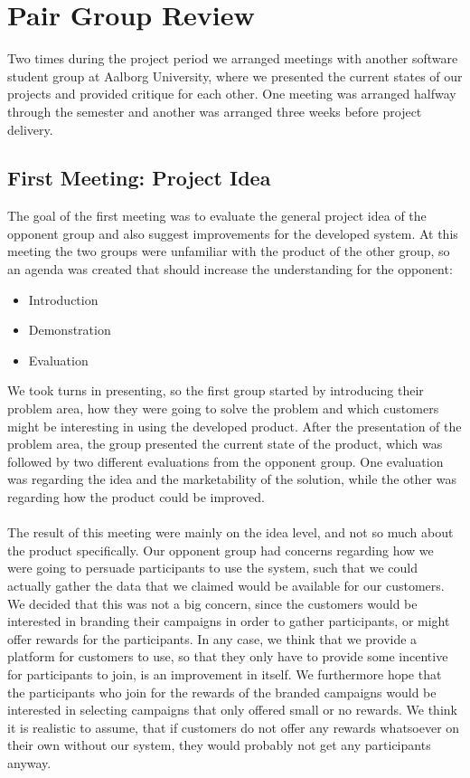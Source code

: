 
\section{Pair Group Review}
\label{sec:pair_group_review}

Two times during the project period we arranged meetings with another software student group at Aalborg University, where we presented the current states of our projects and provided critique for each other. One meeting was arranged halfway through the semester and another was arranged three weeks before project delivery. 

\subsection{First Meeting: Project Idea}
\label{sub:first_meeting_project_idea}
The goal of the first meeting was to evaluate the general project idea of the opponent group and also suggest improvements for the developed system. At this meeting the two groups were unfamiliar with the product of the other group, so an agenda was created that should increase the understanding for the opponent:

\begin{itemize}
    \setlength\itemsep{-0.2em}
    \item Introduction
    \item Demonstration
    \item Evaluation
\end{itemize}

We took turns in presenting, so the first group started by introducing their problem area, how they were going to solve the problem and which customers might be interesting in using the developed product. After the presentation of the problem area, the group presented the current state of the product, which was followed by two different evaluations from the opponent group. One evaluation was regarding the idea and the marketability of the solution, while the other was regarding how the product could be improved. 
\\\\
The result of this meeting were mainly on the idea level, and not so much about the product specifically. Our opponent group had concerns regarding how we were going to persuade participants to use the system, such that we could actually gather the data that we claimed would be available for our customers. We decided that this was not a big concern, since the customers would be interested in branding their campaigns in order to gather participants, or might offer rewards for the participants. In any case, we think that we provide a platform for customers to use, so that they only have to provide some incentive for participants to join, is an improvement in itself. We furthermore hope that the participants who join for the rewards of the branded campaigns would be interested in selecting campaigns that only offered small or no rewards. We think it is realistic to assume, that if customers do not offer any rewards whatsoever on their own without our system, they would probably not get any participants anyway. 

